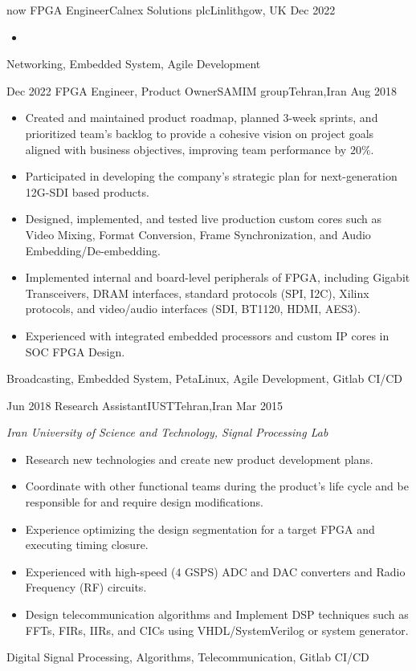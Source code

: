 
\begin{experiences}
	\experience
	{now} {FPGA Engineer}{Calnex Solutions plc}{Linlithgow, UK}
	{Dec 2022} {
		\begin{itemize}
			\item 
		\end{itemize}
	}
	{Networking, Embedded System, Agile Development}
	
	\emptySeparator
	
	\experience
	{Dec 2022} {FPGA Engineer, Product Owner}{SAMIM group}{Tehran,Iran}
	{Aug 2018} {
		\begin{itemize}
			\item Created and maintained product roadmap, planned 3-week sprints,
			      and prioritized team's backlog to provide a cohesive vision on
			      project goals aligned with business objectives, improving team
			      performance by $20\%$.
			\item Participated in developing the company's strategic plan for
			      next-generation 12G-SDI based products.
			\item Designed, implemented, and tested live production custom cores
			      such as Video Mixing, Format Conversion, Frame Synchronization,
			      and Audio Embedding/De-embedding.
			\item Implemented internal and board-level peripherals of FPGA, including
			      Gigabit Transceivers, DRAM interfaces,
			      standard protocols (SPI, I2C), Xilinx protocols, and video/audio
			      interfaces (SDI, BT1120, HDMI, AES3).
			\item Experienced with integrated embedded processors and custom IP cores
			      in SOC FPGA Design.
		\end{itemize}
	}
	{Broadcasting, Embedded System, PetaLinux, Agile Development, Gitlab CI/CD}
	
	\emptySeparator
	
	\experience
	{Jun 2018} {Research Assistant}{IUST}{Tehran,Iran}
	{Mar 2015} {
		\emph{Iran University of Science and Technology, Signal Processing Lab}
		\begin{itemize}
			\item Research new technologies and create new product development plans.
			\item Coordinate with other functional teams during the product's life
			      cycle and be responsible for and require design modifications.
			\item Experience optimizing the design segmentation for a target FPGA
			      and executing timing closure.
			\item Experienced with high-speed ($4$ GSPS) ADC and DAC converters
			      and Radio Frequency (RF) circuits.
			\item Design telecommunication algorithms and Implement DSP techniques
			      such as FFTs, FIRs, IIRs, and CICs using VHDL/SystemVerilog
			      or system generator.
		\end{itemize}
	}
	{Digital Signal Processing, Algorithms, Telecommunication, Gitlab CI/CD}
	

\end{experiences}
